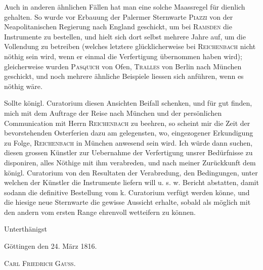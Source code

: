 Auch in anderen ähnlichen Fällen hat man eine solche Maassregel für dienlich gehalten. So wurde vor Erbauung der Palermer Sternwarte \textsc{Piazzi} von der Neapolitanischen Regierung nach England geschickt, um bei \textsc{Ramsden} die Instrumente zu bestellen, und hielt sich dort selbst mehrere Jahre auf, um die Vollendung zu betreiben (welches letztere glücklicherweise bei \textsc{Reichenbach} nicht nöthig sein wird, wenn er einmal die Verfertigung übernommen haben wird); gleicherweise wurden \textsc{Pasquich} von Ofen, \textsc{Tralles} von Berlin nach München geschickt, und noch mehrere ähnliche Beispiele liessen sich anführen, wenn es nöthig wäre.

Sollte königl. Curatorium diesen Ansichten Beifall schenken, und für gut finden, mich mit dem Auftrage der Reise nach München und der persönlichen Communication mit Herrn \textsc{Reichenbach} zu beehren, so scheint mir die Zeit der bevorstehenden Osterferien dazu am gelegensten, wo, eingezogener Erkundigung zu Folge, \textsc{Reichenbach} in München anwesend sein wird. Ich würde dann suchen, diesen grossen Künstler zur Uebernahme der Verfertigung unsrer Bedürfnisse zu disponiren, alles Nöthige mit ihm verabreden, und nach meiner Zurückkunft dem königl. Curatorium von den Resultaten der Verabredung,
\clearpage{}
\noindent den Bedingungen, unter welchen der Künstler die Instrumente liefern will u. s. w. Bericht abstatten, damit sodann die definitive Bestellung vom k. Curatorium verfügt werden könne, und die hiesige neue Sternwarte die gewisse Aussicht erhalte, sobald als möglich mit den andern vom ersten Range ehrenvoll wetteifern zu können.
\begin{flushright}Unterthänigst\end{flushright}
Göttingen den 24. März 1816.
\begin{flushright}\textsc{Carl Friedrich Gauss}.\end{flushright}
\clearpage\endgroup

